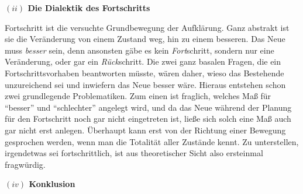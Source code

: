 \documentclass[a4paper, 12pt]{article}
\begin{document}
\begin{onehalfspace}
\vspace{5mm}
\noindent\textbf{$(ii)$ Die Dialektik des Fortschritts}

\noindent Fortschritt ist die versuchte Grundbewegung der Aufklärung. Ganz abstrakt ist sie die Veränderung von einem Zustand weg, hin zu einem besseren. Das Neue muss \emph{besser} sein, denn ansonsten gäbe es kein \emph{Fort}schritt, sondern nur eine Veränderung, oder gar ein \emph{Rück}schritt. Die zwei ganz basalen Fragen, die ein Fortschrittsvorhaben beantworten müsste, wären daher, wieso das Bestehende unzureichend sei und inwiefern das Neue besser wäre. Hieraus entstehen schon zwei grundlegende Problematiken. Zum einen ist fraglich, welches Maß für "`besser"' und "`schlechter"' angelegt wird, und da das Neue während der Planung für den Fortschritt noch gar nicht eingetreten ist, ließe sich solch eine Maß auch gar nicht erst anlegen. Überhaupt kann erst von der Richtung einer Bewegung gesprochen werden, wenn man die Totalität aller Zustände kennt. Zu unterstellen, irgendetwas sei fortschrittlich, ist aus theoretischer Sicht also ersteinmal fragwürdig.  



\vspace{5mm}
%
%
\noindent\textbf{$(iv)$ Konklusion}


\end{onehalfspace}
\end{document}
